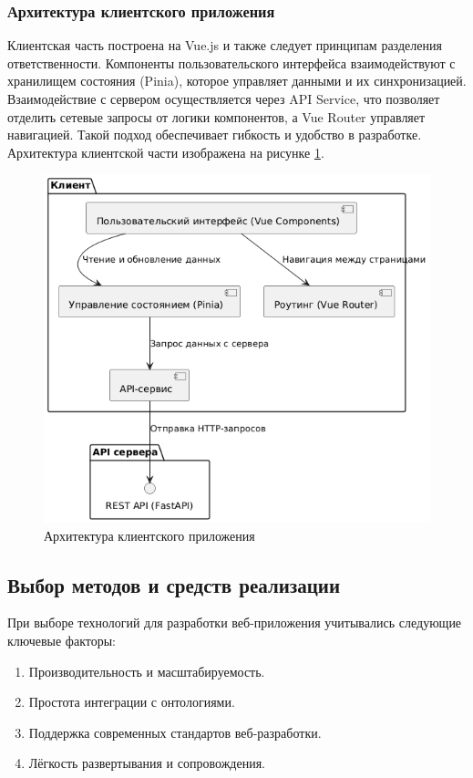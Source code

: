 \subsubsection{Архитектура клиентского приложения}

Клиентская часть построена на Vue.js и также следует принципам разделения ответственности. Компоненты пользовательского интерфейса взаимодействуют с хранилищем состояния (Pinia\cite{Library:Pinia}), которое управляет данными и их синхронизацией. Взаимодействие с сервером осуществляется через API Service, что позволяет отделить сетевые запросы от логики компонентов, а Vue Router\cite{Library:VueRouter} управляет навигацией. Такой подход обеспечивает гибкость и удобство в разработке. Архитектура клиентской части изображена на рисунке \ref{pic:client_arch}.

\begin{figure}[H]
	\centering
	\includegraphics[width=\linewidth]{chapters/img/client_arch.png}
	\caption{Архитектура клиентского приложения}
	\label{pic:client_arch}
\end{figure}

\subsection{Выбор методов и средств реализации}

При выборе технологий для разработки веб-приложения учитывались следующие ключевые факторы:
\begin{enumerate}
    \item Производительность и масштабируемость.
    \item Простота интеграции с онтологиями.
    \item Поддержка современных стандартов веб-разработки.
    \item Лёгкость развертывания и сопровождения.
\end{enumerate}

